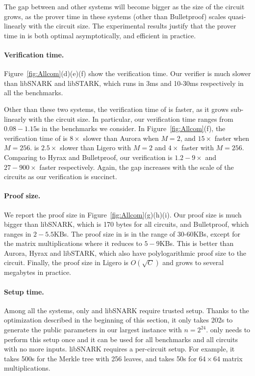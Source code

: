 The gap between \name and other systems will become bigger as the size of the circuit grows, as the prover time in these systems (other than Bulletproof) scales quasi-linearly with the circuit size. The experimental results justify that the prover time in \name is both optimal asymptotically, and efficient in practice.

\paragraph{Verification time.} Figure~\ref{fig:Allcom}(d)(e)(f) show the verification time. Our verifier is much slower than libSNARK and libSTARK, which runs in 3ms and 10-30ms respectively in all the benchmarks. 

Other than these two systems, the verification time of \name is faster, as it grows sub-linearly with the circuit size. In particular, our verification time ranges from $0.08-1.15$s in the benchmarks we consider. In Figure~\ref{fig:Allcom}(f), the verification time of \name is $8\times$ slower than Aurora when $M=2$, and $15\times$ faster when $M=256$. \name is $2.5\times$ slower than Ligero with $M=2$ and $4\times$ faster with $M=256$. Comparing to Hyrax and Bulletproof, our verification is $1.2-9\times$ and $27-900\times$ faster respectively. Again, the gap increases with the scale of the circuits as our verification is succinct.

\paragraph{Proof size.} We report the proof size in Figure~\ref{fig:Allcom}(g)(h)(i). Our proof size is much bigger than libSNARK, which is 170 bytes for all circuits, and Bulletproof, which ranges in $2-5.5$KBs. The proof size in \name is in the range of 30-60KBs, except for the matrix multiplications where it reduces to $5-9$KBs. This is better than Aurora, Hyrax and libSTARK, which also have polylogarithmic proof size to the circuit. Finally, the proof size in Ligero is $O(\sqrt{C})$ and grows to several megabytes in practice.

\paragraph{Setup time.} Among all the systems, only \name and libSNARK require trusted setup. Thanks to the optimization described in the beginning of this section, it only takes 202s to generate the public parameters in our largest instance with $n = 2^24$. \name only needs to perform this setup once and it can be used for all benchmarks and all circuits with no more inputs. libSNARK requires a per-circuit setup. For example, it takes 500s for the Merkle tree with 256 leaves, and takes 50s for $64\times 64$ matrix multiplications. 


